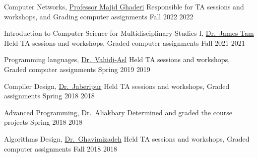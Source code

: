 




\begin{cvhonors}

\cvhonor
{Computer Networks, \href{https://people.ucalgary.ca/~mghaderi/}{Professor Majid Ghaderi}} %
{Responsible for TA sessions and workshops, and Grading computer assignments} %
{Fall 2022} %
{2022}

\cvhonor
{Introduction to Computer Science for Multidisciplinary Studies I, \href{https://contacts.ucalgary.ca/info/cpsc/profiles/102-3412}{Dr.~James Tam}} %
{Held TA sessions and workshops, Graded computer assignments} %
{Fall 2021} %
{2021}

\cvhonor
{Programming languages, \href{http://facultymembers.sbu.ac.ir/vahidi/}{Dr.~Vahidi-Asl}} %
{Held TA sessions and workshops, Graded computer assignments} %
{Spring 2019} %
{2019}

\cvhonor
{Compiler Design, \href{http://facultymembers.sbu.ac.ir/jaberipur/}{Dr.~Jaberipur}} %
{Held TA sessions and workshops, Graded assignments} %
{Spring 2018} %
{2018}

\cvhonor
{Advanced Programming, \href{http://facultymembers.sbu.ac.ir/aliakbary/}{Dr.~Aliakbary}} %
{Determined and graded the course projects} %
{Spring 2018} %
{2018}


\cvhonor
{Algorithms Design, \href{http://en.sbu.ac.ir/Pages/Profiles.aspx?proffID=375537}{Dr.~Ghavimizadeh}} %
{Held TA sessions and workshops, Graded computer assignments} %
{Fall 2018} %
{2018}


\end{cvhonors}
